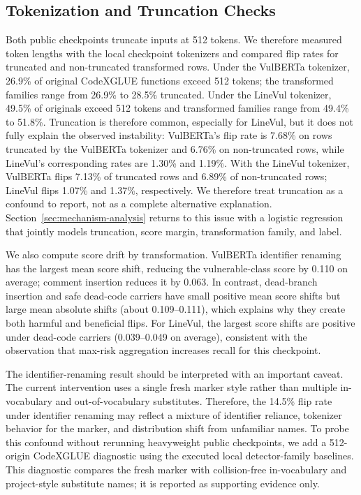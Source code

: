 \documentclass[a4paper,fleqn]{cas-dc}
\begin{document}
\subsection{Tokenization and Truncation Checks}

Both public checkpoints truncate inputs at 512 tokens. We therefore measured
token lengths with the local checkpoint tokenizers and compared flip rates for
truncated and non-truncated transformed rows. Under the VulBERTa tokenizer,
26.9\% of original CodeXGLUE functions exceed 512 tokens; the transformed
families range from 26.9\% to 28.5\% truncated. Under the LineVul tokenizer,
49.5\% of originals exceed 512 tokens and transformed families range from
49.4\% to 51.8\%. Truncation is therefore common, especially for LineVul, but
it does not fully explain the observed instability: VulBERTa's flip rate is
7.68\% on rows truncated by the VulBERTa tokenizer and 6.76\% on non-truncated
rows, while LineVul's corresponding rates are 1.30\% and 1.19\%. With the
LineVul tokenizer, VulBERTa flips 7.13\% of truncated rows and 6.89\% of
non-truncated rows; LineVul flips 1.07\% and 1.37\%, respectively. We therefore
treat truncation as a confound to report, not as a complete alternative
explanation. Section~\ref{sec:mechanism-analysis} returns to this issue with a
logistic regression that jointly models truncation, score margin,
transformation family, and label.

We also compute score drift by transformation. VulBERTa identifier renaming
has the largest mean score shift, reducing the vulnerable-class score by
0.110 on average; comment insertion reduces it by 0.063. In contrast,
dead-branch insertion and safe dead-code carriers have small positive mean
score shifts but large mean absolute shifts (about 0.109--0.111), which
explains why they create both harmful and beneficial flips. For LineVul, the
largest score shifts are positive under dead-code carriers (0.039--0.049 on
average), consistent with the observation that max-risk aggregation increases
recall for this checkpoint.

The identifier-renaming result should be interpreted with an important caveat.
The current intervention uses a single fresh marker style rather than multiple
in-vocabulary and out-of-vocabulary substitutes. Therefore, the 14.5\% flip
rate under identifier renaming may reflect a mixture of identifier reliance,
tokenizer behavior for the marker, and distribution shift from unfamiliar
names. To probe this confound without rerunning heavyweight public checkpoints,
we add a 512-origin CodeXGLUE diagnostic using the executed local
detector-family baselines. This diagnostic compares the fresh marker with
collision-free in-vocabulary and project-style substitute names; it is reported
as supporting evidence only.
\end{document}
